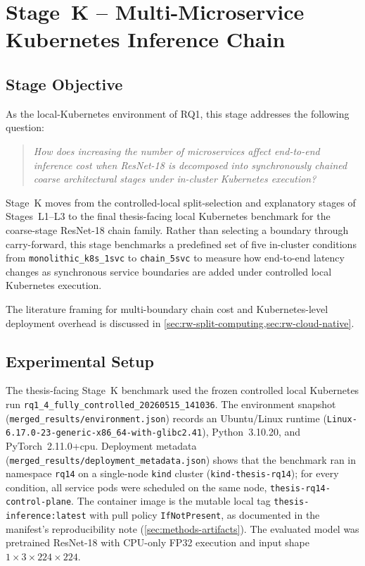 \section{Stage~K -- Multi-Microservice Kubernetes Inference Chain}
\label{sec:rq14}

\subsection{Stage Objective}

As the local-Kubernetes environment of RQ1, this stage addresses the following question:

\begin{quote}
\textit{How does increasing the number of microservices affect end-to-end inference
cost when ResNet-18 is decomposed into synchronously chained coarse architectural stages
under in-cluster Kubernetes execution?}
\end{quote}

Stage~K moves from the controlled-local split-selection and explanatory stages of
Stages~L1--L3 to the final thesis-facing local Kubernetes benchmark for the
coarse-stage ResNet-18 chain family.
Rather than selecting a boundary through carry-forward, this stage benchmarks a
predefined set of five in-cluster conditions from \texttt{monolithic\_k8s\_1svc} to
\texttt{chain\_5svc} to measure how end-to-end latency changes as synchronous service
boundaries are added under controlled local Kubernetes execution.

The literature framing for multi-boundary chain cost and Kubernetes-level
deployment overhead is discussed in
\cref{sec:rw-split-computing,sec:rw-cloud-native}.

\subsection{Experimental Setup}

The thesis-facing Stage~K benchmark used the frozen controlled local Kubernetes run
\texttt{rq1\_4\_fully\_controlled\_20260515\_141036}. The environment snapshot
(\texttt{merged\_results/environment.json}) records an Ubuntu/Linux runtime
(\texttt{Linux-6.17.0-23-generic-x86\_64-with-glibc2.41}), Python~3.10.20, and
PyTorch~2.11.0+cpu. Deployment metadata
(\texttt{merged\_results/deployment\_metadata.json}) shows that the benchmark ran
in namespace \texttt{rq14} on a single-node \texttt{kind} cluster
(\texttt{kind-thesis-rq14}); for every condition, all service pods were scheduled
on the same node, \texttt{thesis-rq14-control-plane}. The container image is the
mutable local tag \texttt{thesis-inference:latest} with pull policy
\texttt{IfNotPresent}, as documented in the manifest's reproducibility note
(\cref{sec:methods-artifacts}). The evaluated model was pretrained ResNet-18
with CPU-only FP32 execution and input shape $1 \times 3 \times 224 \times 224$.

